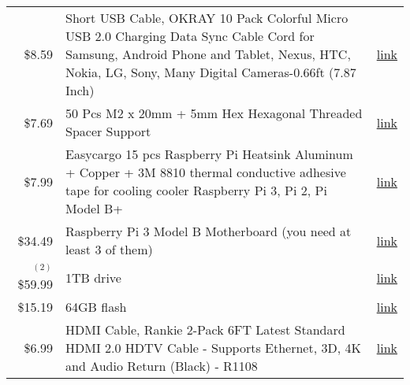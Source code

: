 \begin{table}[htb]
{\begin{tabular}{rp{13cm}p{1cm}}
  \$8.59  & Short USB Cable, OKRAY 10 Pack Colorful Micro
            USB 2.0 Charging Data Sync Cable Cord for
            Samsung, Android Phone and Tablet, Nexus, HTC,
            Nokia, LG, Sony, Many Digital Cameras-0.66ft
            (7.87 Inch) & 
                          \href{https://www.amazon.com/OKRAY-Colorful-Charging-Samsung-Cameras-0-66ft/dp/B00R5GZJR6/ref=sr\_1\_6?s=pc\&ie=UTF8\&qid=1498447476\&sr=1-6\&keywords=micro+usb+cable+1ft}{link}         \\


  \$7.69    & 50 Pcs M2 x 20mm + 5mm Hex Hexagonal Threaded
              Spacer Support
                         & 
                           \href{https://www.amazon.com/20mm-Hexagonal-Threaded-Spacer-Support/dp/B00FH8AB8Q/ref=sr\_1\_9?s=industrial\&ie=UTF8\&qid=1513700337\&sr=1-9\&keywords=hex+spacers+m2+20mm}{link}
  \\

  \$7.99  & Easycargo 15 pcs Raspberry Pi Heatsink Aluminum
            + Copper + 3M 8810 thermal conductive adhesive
            tape for cooling cooler Raspberry Pi 3, Pi 2,
            Pi Model B+
                         & 
                           \href{https://www.amazon.com/Easycargo-Raspberry-Heatsink-Aluminum-conductive/dp/B07217N5LS/ref=sr\_1\_3?s=industrial\&ie=UTF8\&qid=1513700498\&sr=1-3\&keywords=raspberry+pi+3}{link}
  \\

  \$34.49 & Raspberry Pi 3 Model B Motherboard  (you need at least 3 of them)   & 
                                                                                  \href{https://www.amazon.com/Raspberry-Pi-RASPBERRYPI3-MODB-1GB-Model-Motherboard/dp/B01CD5VC92}{link}
  \\

 $^{(2)}$ \$59.99 & 1TB drive   & \href{http://wdlabs.wd.com/products/wd-pidrive-berryboot-edition/}{link}    \\

  \$15.19 & 64GB flash  & \href{https://www.wdc.com/products/wdlabs/wd-pidrive-foundation-edition.html\#WD3750LMCW}{link} \\

  \$6.99  & HDMI Cable, Rankie 2-Pack 6FT Latest Standard
            HDMI 2.0 HDTV Cable - Supports Ethernet, 3D, 4K
            and Audio Return (Black) - R1108
                         & 
                           \href{https://www.amazon.com/Cable-Rankie-2-Pack-Latest-Standard/dp/B00Z07XQ4A/ref=sr\_1\_6?s=wireless\&ie=UTF8\&qid=1513782649\&sr=1-6\&keywords=hdmi+cable+6ft}{link}         \\


\end{tabular}}
\end{table}
